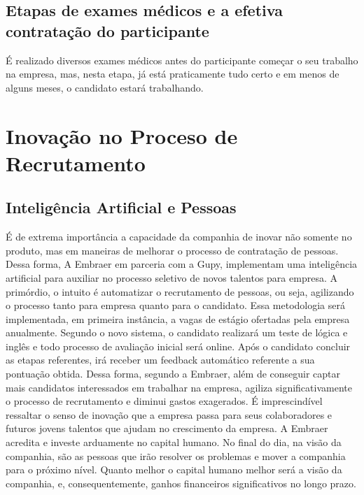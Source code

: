 \section{ Etapas de exames médicos e a efetiva contratação do participante}
É realizado diversos exames médicos antes do participante começar o seu trabalho na empresa, mas, nesta etapa, já está praticamente tudo certo e em menos de alguns meses,  o candidato estará trabalhando.


\chapter{Inovação no Proceso de Recrutamento}
\section{Inteligência Artificial e Pessoas}
É de extrema importância a capacidade da companhia de inovar não somente no produto, mas em maneiras de melhorar o processo de contratação de pessoas. Dessa forma,
A Embraer em parceria com a Gupy, implementam uma inteligência artificial para auxiliar no processo seletivo de novos talentos para empresa. A primórdio, o intuito é automatizar o recrutamento de pessoas, ou seja, agilizando o processo tanto para empresa quanto para o candidato. Essa metodologia será implementada, em primeira instância, a vagas de estágio ofertadas pela empresa anualmente. Segundo o novo sistema, o candidato realizará um teste de lógica e inglês e todo processo de avaliação inicial será online. Após o candidato concluir as etapas referentes, irá receber um feedback automático referente a sua pontuação obtida. Dessa forma, segundo a Embraer, além de conseguir captar mais candidatos interessados em trabalhar na empresa, agiliza significativamente o processo de recrutamento e diminui gastos exagerados.
É imprescindível ressaltar o senso de inovação que a empresa passa para seus colaboradores e futuros jovens talentos que ajudam no crescimento da empresa. A Embraer acredita e investe arduamente no capital humano. No final do dia, na visão da companhia, são as pessoas que irão resolver os problemas e mover a companhia para o próximo nível. Quanto melhor o capital humano melhor será a visão da companhia, e, consequentemente, ganhos financeiros significativos no longo prazo.







